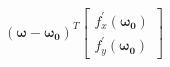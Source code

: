 \documentclass[preview]{standalone}
\begin{document}
\begin{align*}
(\mathbf{\omega} - \mathbf{\omega_0})^T\begin{bmatrix} f_x^{\prime}(\mathbf{\omega_0}) \\ f_y^{\prime}(\mathbf{\omega_0}) \end{bmatrix}
\end{align*}
\end{document}

